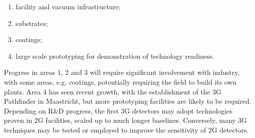 \begin{enumerate}
\item facility and vacuum infrastructure; 
\item substrates; 
\item coatings; 
\item large scale prototyping for demonstration of technology readiness. 
\end{enumerate}

\noindent Progress in areas 1, 2 and 3 will require significant involvement with industry, with some areas, e.g. coatings,  potentially requiring the field to build its own plants. Area 4 has seen recent growth, with the establishment of the 3G Pathfinder in Maastricht, but more prototyping facilities are likely to be required. Depending on R\&D progress, the first 3G detectors may adopt technologies proven in 2G facilities, scaled up to much longer baselines. Conversely, many 3G techniques may be tested or employed to improve the sensitivity of 2G detectors. 

